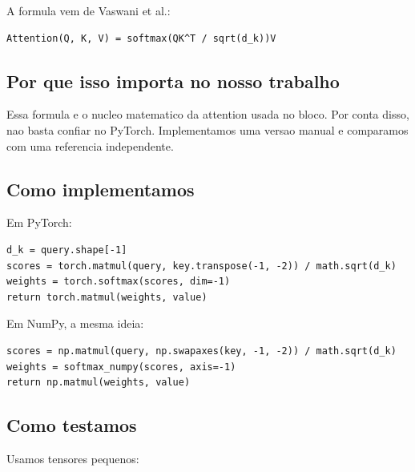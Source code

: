 A formula vem de Vaswani et al.:



\begin{Verbatim}[fontsize=\small,breaklines=true,label=text]
Attention(Q, K, V) = softmax(QK^T / sqrt(d_k))V
\end{Verbatim}



\subsection{Por que isso importa no nosso trabalho}





Essa formula e o nucleo matematico da attention usada no bloco. Por conta disso, nao basta confiar no PyTorch. Implementamos uma versao manual e comparamos com uma referencia independente.



\subsection{Como implementamos}



Em PyTorch:



\begin{Verbatim}[fontsize=\small,breaklines=true,label=python]
d_k = query.shape[-1]
scores = torch.matmul(query, key.transpose(-1, -2)) / math.sqrt(d_k)
weights = torch.softmax(scores, dim=-1)
return torch.matmul(weights, value)
\end{Verbatim}



Em NumPy, a mesma ideia:



\begin{Verbatim}[fontsize=\small,breaklines=true,label=python]
scores = np.matmul(query, np.swapaxes(key, -1, -2)) / math.sqrt(d_k)
weights = softmax_numpy(scores, axis=-1)
return np.matmul(weights, value)
\end{Verbatim}



\subsection{Como testamos}



Usamos tensores pequenos:



